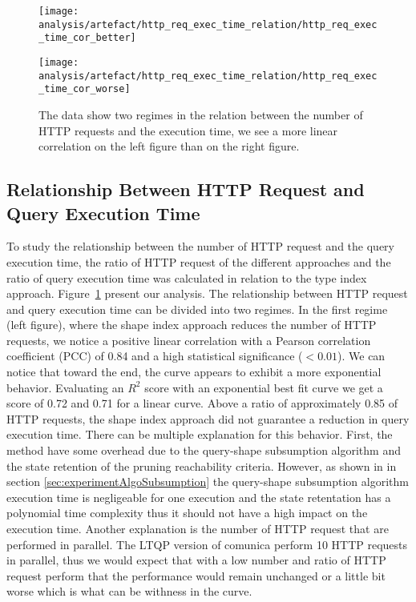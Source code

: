 \begin{figure}[htbp]
    \centering
    \begin{minipage}[t]{1.0\linewidth}
        \centering
        \texttt{[image: analysis/artefact/http\_req\_exec\_time\_relation/http\_req\_exec\_time\_cor\_better]}
        \label{fig:http_req_exec_time_cor_better}
    \end{minipage}
    \hspace{0.05\textwidth}
    \begin{minipage}[t]{1.0\linewidth}
        \centering
        \texttt{[image: analysis/artefact/http\_req\_exec\_time\_relation/http\_req\_exec\_time\_cor\_worse]}
        \label{fig:http_req_exec_time_cor_worse}
    \end{minipage}

    \caption{
        The data show two regimes in the relation between the number of HTTP requests and the execution time, 
        we see a more linear correlation on the left figure than on the right figure.
        }
    \label{fig:http_req_exec_time_cor}
\end{figure}

\subsection{Relationship Between HTTP Request and Query Execution Time}


To study the relationship between the number of HTTP request and the query execution time, the ratio of HTTP request of the different approaches and the ratio of query execution time was 
calculated in relation to the type index approach.
Figure~\ref{fig:http_req_exec_time_cor} present our analysis.
The relationship between HTTP request and query execution time can be divided into two regimes.
In the first regime (left figure), where the shape index approach reduces the number of HTTP requests, we notice a positive linear correlation with a Pearson correlation coefficient (PCC) of 0.84 and a high statistical significance ($< 0.01$).
We can notice that toward the end, the curve appears to exhibit a more exponential behavior.
Evaluating an $R^2$ score with an exponential best fit curve we get a score of 0.72 and 0.71 for a linear curve.
Above a ratio of approximately 0.85 of HTTP requests, the shape index approach did not guarantee a reduction in query execution time.
There can be multiple explanation for this behavior.
First, the method have some overhead due to the query-shape subsumption algorithm and the state retention of the pruning reachability criteria.
However, as shown in in section \ref{sec:experimentAlgoSubsumption} the query-shape subsumption algorithm execution time is negligeable for one execution and the state retentation has a polynomial time complexity thus it should not have a high impact on the execution time.
Another explanation is the number of HTTP request that are performed in parallel.
The LTQP version of comunica perform 10 HTTP requests in parallel, thus we would expect that with a low number and ratio of HTTP request perform that the performance would remain unchanged or a little bit worse which is what can be withness in the curve.

